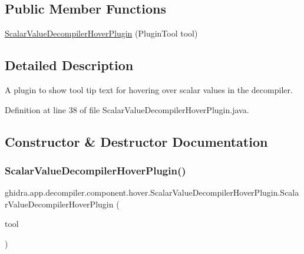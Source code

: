 \subsection*{Public Member Functions}
\begin{DoxyCompactItemize}
\item 
\mbox{\hyperlink{classghidra_1_1app_1_1decompiler_1_1component_1_1hover_1_1_scalar_value_decompiler_hover_plugin_aba756951f76bb7ce69c1c7b67136e15e}{Scalar\+Value\+Decompiler\+Hover\+Plugin}} (Plugin\+Tool tool)
\end{DoxyCompactItemize}


\subsection{Detailed Description}
A plugin to show tool tip text for hovering over scalar values in the decompiler. 

Definition at line 38 of file Scalar\+Value\+Decompiler\+Hover\+Plugin.\+java.



\subsection{Constructor \& Destructor Documentation}
\mbox{\label{classghidra_1_1app_1_1decompiler_1_1component_1_1hover_1_1_scalar_value_decompiler_hover_plugin_aba756951f76bb7ce69c1c7b67136e15e}} 
\subsubsection{\texorpdfstring{ScalarValueDecompilerHoverPlugin()}{ScalarValueDecompilerHoverPlugin()}}
{\footnotesize\ttfamily ghidra.\+app.\+decompiler.\+component.\+hover.\+Scalar\+Value\+Decompiler\+Hover\+Plugin.\+Scalar\+Value\+Decompiler\+Hover\+Plugin (\begin{DoxyParamCaption}\item[{Plugin\+Tool}]{tool }\end{DoxyParamCaption})\hspace{0.3cm}{\ttfamily [inline]}}




